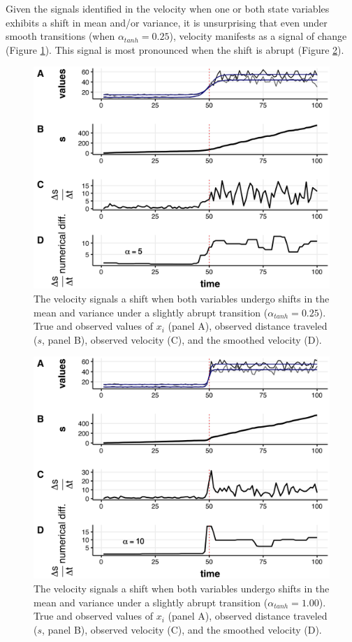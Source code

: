 \documentclass[print]{nuthesis}
\begin{document}
Given the signals identified in the velocity when one or both state variables exhibits a shift in mean and/or variance, it is unsurprising that even under smooth transitions (when \(\alpha_{tanh} = 0.25\)), velocity manifests as a signal of change (Figure \ref{fig:muVarBoth25}). This signal is most pronounced when the shift is abrupt (Figure \ref{fig:muVarBoth1}).
\begin{figure}
\includegraphics[width=0.85\linewidth]{./chapterFiles/velocity/figsCalledInDiss/changeMuVarBoth_tanhAlpha025-5tvdiffAlpha-1000iter_stackTvdiff} \caption{The velocity signals a shift when both variables undergo shifts in the mean and variance under a slightly abrupt transition ($\alpha_{tanh}=0.25$). True and observed values of $x_i$ (panel A), observed distance traveled ($s$, panel B), observed velocity (C), and the smoothed velocity (D).}\label{fig:muVarBoth25}
\end{figure}
\newpage
\begin{figure}
\includegraphics[width=0.85\linewidth]{./chapterFiles/velocity/figsCalledInDiss/changeMuVarBoth_tanhAlpha1-10tvdiffAlpha-1000iter_stackTvdiff} \caption{The velocity signals a shift when both variables undergo shifts in the mean and variance under a slightly abrupt transition ($\alpha_{tanh}=1.00$). True and observed values of $x_i$ (panel A), observed distance traveled ($s$, panel B), observed velocity (C), and the smoothed velocity (D).}\label{fig:muVarBoth1}
\end{figure}
\end{document}
